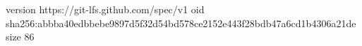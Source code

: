 version https://git-lfs.github.com/spec/v1
oid sha256:abbba40edbbebe9897d5f32d54bd578ce2152e443f28bdb47a6cd1b4306a21de
size 86
